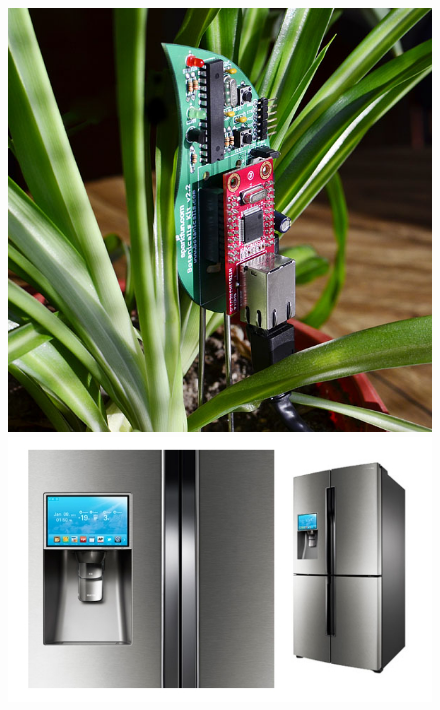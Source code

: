 \documentclass{beamer}
\begin{document}
\begin{frame}[t]
{\begin{figure}[htb]
\begin{minipage}{0.3\textwidth}
        \includegraphics[scale=0.45]{presentation/img/smart-plant.jpg}
      \end{minipage}%
      \begin{minipage}{0.3\textwidth}
        \centering
          \includegraphics[scale=0.2]{presentation/img/smart-fridge.jpg}
      \end{minipage}%
      \begin{minipage}{0.3\textwidth}
        \centering

\end{minipage}
\end{figure}}
\end{frame}
\end{document}
